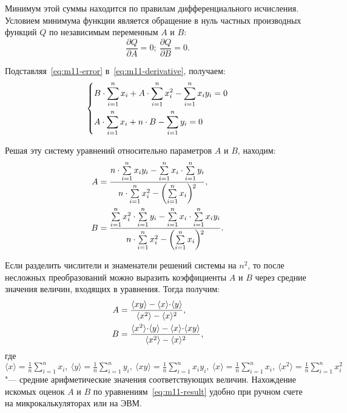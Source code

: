 \documentclass[a4paper, 12pt]{extarticle}
\newcommand{\isum}{\sum\limits_{i=1}^{n}}
\newcommand{\angled}[1]{\ensuremath{\langle #1 \rangle}}
\newcommand{\meanx}{\ensuremath{\angled{x}}}
\newcommand{\meany}{\ensuremath{\angled{y}}}
\newcommand{\meanxy}{\ensuremath{\angled{xy}}}
\newcommand{\meanxs}{\ensuremath{\angled{x^2}}}
\newcommand{\ccdot}{\kern-0.21em \cdot \kern-0.21em}
\begin{document}
{Минимум этой суммы находится по правилам дифференциального исчисления. Условием минимума функции является обращение в нуль частных производных функций $Q$ по независимым переменным $A$ и $B$:  %
\begin{equation}
\label{eq:m11-derivative}
\frac{\partial Q}{\partial A} = 0; \ \frac{\partial Q}{\partial B} = 0. %
\end{equation}

Подставляя~\eqref{eq:m11-error} в~\eqref{eq:m11-derivative}, получаем: %
\begin{equation}
\label{eq:m11-system}
\left\{ \aligned
&B \cdot \isum x_i + A \cdot \isum x_i^2 - \isum x_i y_i = 0 \\ %
&A \cdot \isum x_i + n \cdot B - \isum y_i = 0  %
\endaligned \right.
\end{equation}

Решая эту систему уравнений относительно параметров $A$ и $B$, находим:
\begin{equation}
\label{eq:m11-solution}
\aligned
A &= \frac{n \cdot \isum x_i y_i - \isum x_i \cdot \isum y_i}{n \cdot \isum x_i^2 - \left( \isum x_i \right){\kern -.25em\vphantom{\Big(}}^2}, \\
B &= \frac{\isum x_i^2 \cdot \isum y_i - \isum x_i \cdot \isum x_i y_i}{n \cdot \isum x_i^2 - \left( \isum x_i \right){\kern -.25em\vphantom{\Big(}}^2}. %
\endaligned
\end{equation}

Если разделить числители и знаменатели решений системы на $n^2$, то после несложных преобразований можно выразить коэффициенты $A$ и $B$ через средние значения величин, входящих в уравнения. Тогда получим: %
\begin{equation}
\label{eq:m11-result}
\aligned
A &= \frac{\meanxy - \meanx \ccdot \meany}{\meanxs - \meanx^2}, \\
B &= \frac{\meanxs \ccdot \meany - \meanx \ccdot \meanxy}{\meanxs - \meanx^2},
\endaligned
\end{equation}
где
$
\meanx = \frac{1}{n} \isum x_i, \ \meany = \frac{1}{n} \isum y_i, \ \meanxy = \frac{1}{n} \isum x_i y_i, \ \meanx = \frac{1}{n} \isum x_i,\ \meanxs = \frac{1}{n}  \isum x_i^2
$
"--- средние арифметические значения соответствующих величин. Нахождение искомых оценок $A$ и $B$ по уравнениям~\eqref{eq:m11-result} удобно при ручном счете на микрокалькуляторах или на ЭВМ.

}
\end{document}
